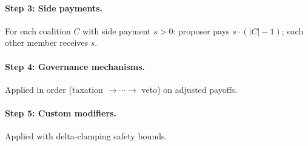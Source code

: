 \paragraph{Step 3: Side payments.}
For each coalition $C$ with side payment $s > 0$:
proposer pays $s \cdot (|C| - 1)$; each other member receives $s$.

\paragraph{Step 4: Governance mechanisms.}
Applied in order (taxation $\to \cdots \to$ veto) on adjusted payoffs.

\paragraph{Step 5: Custom modifiers.}
Applied with delta-clamping safety bounds.
